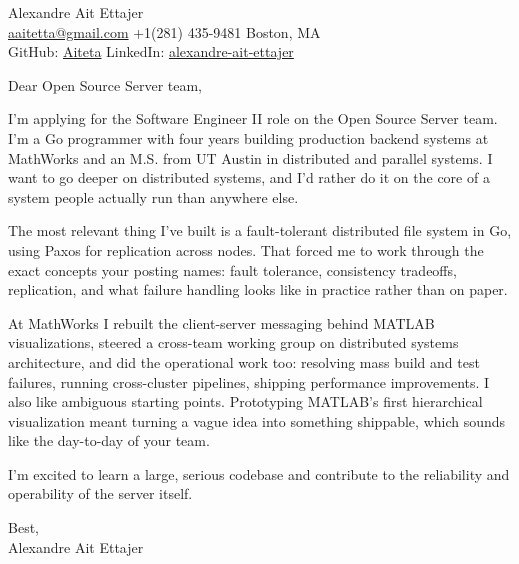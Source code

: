 \documentclass{article}
\begin{document}
\begin{flushleft}
    {\Large Alexandre Ait Ettajer} \\
    \href{mailto:aaitetta@gmail.com}{aaitetta@gmail.com} \quad +1(281) 435-9481 \quad Boston, MA \\
    GitHub: \href{https://github.com/aiteta}{Aiteta} \quad LinkedIn: \href{https://www.linkedin.com/in/alexandre-ait-ettajer-65740b170/}{alexandre-ait-ettajer} \\
\end{flushleft}

\vspace{1em}

Dear Open Source Server team,

I'm applying for the Software Engineer II role on the Open Source Server team. I'm a Go programmer with four years building production backend systems at MathWorks and an M.S. from UT Austin in distributed and parallel systems. I want to go deeper on distributed systems, and I'd rather do it on the core of a system people actually run than anywhere else.

The most relevant thing I've built is a fault-tolerant distributed file system in Go, using Paxos for replication across nodes. That forced me to work through the exact concepts your posting names: fault tolerance, consistency tradeoffs, replication, and what failure handling looks like in practice rather than on paper.

At MathWorks I rebuilt the client-server messaging behind MATLAB visualizations, steered a cross-team working group on distributed systems architecture, and did the operational work too: resolving mass build and test failures, running cross-cluster pipelines, shipping performance improvements. I also like ambiguous starting points. Prototyping MATLAB's first hierarchical visualization meant turning a vague idea into something shippable, which sounds like the day-to-day of your team.

I'm excited to learn a large, serious codebase and contribute to the reliability and operability of the server itself.

Best, \\
Alexandre Ait Ettajer
\end{document}
